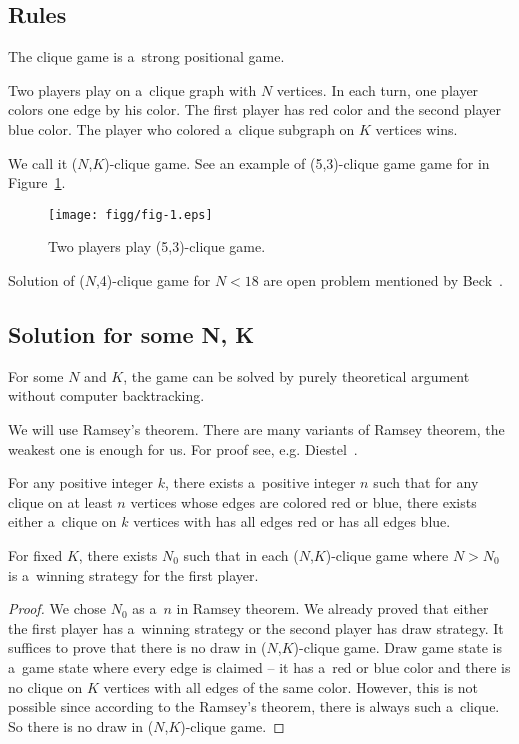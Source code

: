 \subsection{Rules}

The clique game is a~strong positional game. 

Two players play on a~clique graph with
$N$ vertices. In each turn, one player colors one edge by his color. The first
player has red color and the second player blue color. The player who colored
a~clique subgraph on $K$ vertices wins. 

We call it ($N$,$K$)-clique game.
See an example of (5,3)-clique game game for in Figure~\ref{jedna}.

\begin{figure}
	\centerline{\mbox{\texttt{[image: figg/fig-1.eps]}}}
	\caption{Two players play (5,3)-clique game.}
	\label{jedna}
\end{figure}

Solution of ($N$,4)-clique game for $N < 18$ are open problem mentioned
by Beck~\cite{beck}.

\subsection{Solution for some N, K}

For some $N$ and $K$, the game can be solved by purely theoretical argument
without computer backtracking.

We will use Ramsey's theorem. There are many variants of Ramsey theorem, the weakest
one is enough for us. For proof see, e.g. Diestel~\cite{ramsey}. 

\begin{theorem} 
	
For any positive integer $k$, there exists a~positive integer $n$ such that for
any clique on at least $n$ vertices whose edges are colored red or blue, there
exists either a~clique on $k$ vertices with has all edges red or has all edges
blue.

\end{theorem}

\begin{theorem} \label{solution} 
	
For fixed $K$, there exists $N_0$ such that in each ($N$,$K$)-clique game where
$N > N_0$ is a~winning strategy for the first player.  

\end{theorem}

\begin{proof} 
	
We chose $N_0$ as a~$n$ in Ramsey theorem. We already proved that either the
first player has a~winning strategy or the second player has draw strategy. It
suffices to prove that there is no draw in ($N$,$K$)-clique game. Draw game
state is a~game state where every edge is claimed -- it has a~red or blue color
and there is no clique on $K$ vertices with all edges of the same color.
However, this is not possible since according to the Ramsey's theorem, there is
always such a~clique. So there is no draw in ($N$,$K$)-clique game.

\end{proof}

